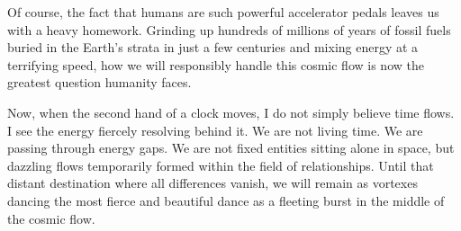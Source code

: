 \documentclass[11pt,a4paper]{article}
\begin{document}
Of course, the fact that humans are such powerful accelerator pedals leaves us with a heavy homework. Grinding up hundreds of millions of years of fossil fuels buried in the Earth's strata in just a few centuries and mixing energy at a terrifying speed, how we will responsibly handle this cosmic flow is now the greatest question humanity faces.

Now, when the second hand of a clock moves, I do not simply believe time flows. I see the energy fiercely resolving behind it. We are not living time. We are passing through energy gaps. We are not fixed entities sitting alone in space, but dazzling flows temporarily formed within the field of relationships. Until that distant destination where all differences vanish, we will remain as vortexes dancing the most fierce and beautiful dance as a fleeting burst in the middle of the cosmic flow.
\end{document}

